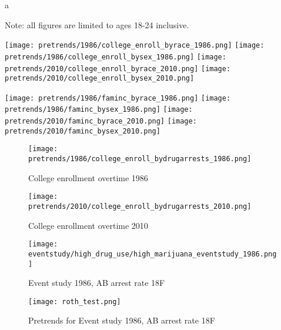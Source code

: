 \documentclass{article}
\begin{document}

\clearpage
\nocite{*}
\singlespacing



a
\clearpage

Note: all figures are limited to ages 18-24 inclusive.

\begin{center}
  \texttt{[image: pretrends/1986/college\_enroll\_byrace\_1986.png]}
  \texttt{[image: pretrends/1986/college\_enroll\_bysex\_1986.png]}
  \texttt{[image: pretrends/2010/college\_enroll\_byrace\_2010.png]}
  \texttt{[image: pretrends/2010/college\_enroll\_bysex\_2010.png]}
\end{center}

\clearpage

\begin{center}
  \texttt{[image: pretrends/1986/faminc\_byrace\_1986.png]}
  \texttt{[image: pretrends/1986/faminc\_bysex\_1986.png]}
  \texttt{[image: pretrends/2010/faminc\_byrace\_2010.png]}
  \texttt{[image: pretrends/2010/faminc\_bysex\_2010.png]}
\end{center}

\clearpage

\begin{figure}[h]
  \caption{College enrollment overtime 1986}
  \centering
  \texttt{[image: pretrends/1986/college\_enroll\_bydrugarrests\_1986.png]}
  \label{fig:TBD}
\end{figure}

\clearpage

\begin{figure}[h]
  \caption{College enrollment overtime 2010}
  \centering
  \texttt{[image: pretrends/2010/college\_enroll\_bydrugarrests\_2010.png]}
  \label{fig:TBD}
\end{figure}

\clearpage

\begin{figure}[h]
  \caption{Event study 1986, AB arrest rate 18F}
  \centering
  \texttt{[image: eventstudy/high\_drug\_use/high\_marijuana\_eventstudy\_1986.png]}
  \label{fig:TBD}
\end{figure}

\begin{figure*}[h]
  \caption{Pretrends for Event study 1986, AB arrest rate 18F}
  \texttt{[image: roth\_test.png]}
\end{figure*}
\end{document}
